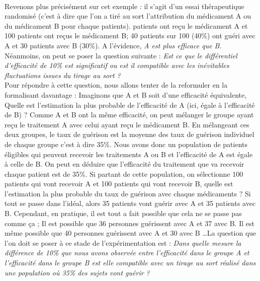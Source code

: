 \\
Revenons plus précisément sur cet exemple : il s'agit d'un essai thérapeutique randomisé (c'est à dire que l'on a tiré au sort l'attribution du médicament A ou du médicament B pour chaque patients).  patients ont reçu le médicament A et 100 patients ont reçus le médicament B; 40 patients sur 100 (40\%) ont guéri avec A et 30 patients avec B (30\%). A l'évidence, \textit{A est plus efficace que B}.\newline
Néanmoins, on peut se poser la question suivante : \textit{Est ce que le différentiel d'efficacité de 10\% est significatif ou est il compatible avec les inévitables fluctuations issues du tirage au sort ?}\newline
\\
Pour répondre à cette question, nous allons tenter de la reformuler en la formalisant davantage : \newline
Imaginons que A et B soit d'une efficacité équivalente, Quelle est l'estimation la plus probable de l'efficacité de A (ici, égale à l'efficacité de B) ?\newline 
Comme A et B ont la même efficacité, on peut mélanger le groupe ayant reçu le traitement A avec celui ayant reçu le médicament B. En mélangeant ces deux groupes, le taux de guérison est la moyenne des taux de guérison individuel de chaque groupe c'est à dire 35\%.\newline
Nous avons donc un population de patients éligibles qui peuvent recevoir les traitements A ou B et l'efficacité de A est égale à celle de B. On peut en déduire que l'efficacité du traitement que va recevoir chaque patient est de 35\%.\newline
Si partant de cette population, on sélectionne 100 patients qui vont recevoir A et 100 patients qui vont recevoir B, quelle est l'estimation la plus probable du taux de guérison avec chaque médicaments ?\newline
Si tout se passe dans l'idéal, alors 35 patients vont guérir avec A et 35 patients avec B. Cependant, en pratique, il est tout a fait possible que cela ne se passe pas comme ça ; Il est possible que 36 personnes guérissent avec A et 37 avec B. Il est même possible que 40 personnes guérissent avec A et 30 avec B \dots La question que l'on doit se poser à ce stade de l'expérimentation est : \textit{Dans quelle mesure la différence de 10\% que nous avons observée entre l'efficacité dans le groupe A et l'efficacité dans le groupe B est elle compatible avec un tirage au sort réalisé dans une population où 35\% des sujets vont guérir ?}\newline
